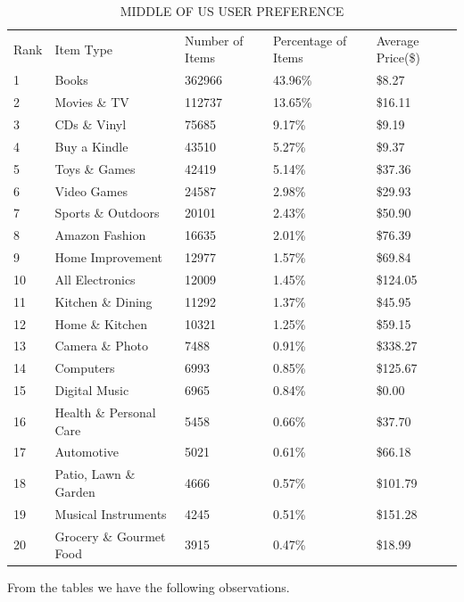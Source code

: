 \documentclass{llncs}
\begin{document}
\begin{table}[!htbp]
\caption{MIDDLE OF US USER PREFERENCE}
\label{tb:mid}
\begin{tabular}{lllll}
Rank & Item Type          & Number of Items & Percentage of Items & Average Price(\$) \\
1 & Books & 362966 & 43.96\% & \$8.27 \\
2 & Movies \& TV & 112737 & 13.65\% & \$16.11 \\
3 & CDs \& Vinyl & 75685 & 9.17\% & \$9.19 \\
4 & Buy a Kindle & 43510 & 5.27\% & \$9.37 \\
5 & Toys \& Games & 42419 & 5.14\% & \$37.36 \\
6 & Video Games & 24587 & 2.98\% & \$29.93 \\
7 & Sports \& Outdoors & 20101 & 2.43\% & \$50.90 \\
8 & Amazon Fashion & 16635 & 2.01\% & \$76.39 \\
9 & Home Improvement & 12977 & 1.57\% & \$69.84 \\
10 & All Electronics & 12009 & 1.45\% & \$124.05 \\
11 & Kitchen \& Dining & 11292 & 1.37\% & \$45.95 \\
12 & Home \& Kitchen & 10321 & 1.25\% & \$59.15 \\
13 & Camera \& Photo & 7488 & 0.91\% & \$338.27 \\
14 & Computers & 6993 & 0.85\% & \$125.67 \\
15 & Digital Music & 6965 & 0.84\% & \$0.00 \\
16 & Health \& Personal Care & 5458 & 0.66\% & \$37.70 \\
17 & Automotive & 5021 & 0.61\% & \$66.18 \\
18 & Patio, Lawn \& Garden & 4666 & 0.57\% & \$101.79 \\
19 & Musical Instruments & 4245 & 0.51\% & \$151.28 \\
20 & Grocery \& Gourmet Food & 3915 & 0.47\% & \$18.99 \\
\end{tabular}
\end{table}

From the tables we have the following observations.
\end{document}
